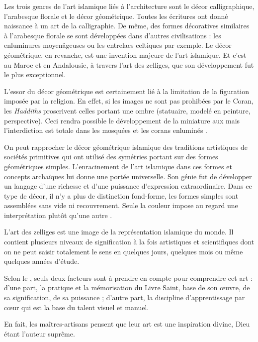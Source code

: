Les trois genres de l'art islamique liés à l'architecture sont le 
décor calligraphique, l'arabesque florale et le décor géométrique. 
Toutes les écritures ont donné naissance à un art de la calligraphie. 
De même, des formes décoratives similaires à l'arabesque florale se 
sont développées dans d'autres civilisations : les enluminures 
moyenâgeuses ou les entrelacs celtiques par exemple. Le décor 
géométrique, en revanche, est une invention majeure de l'art 
islamique. Et c'est au Maroc et en Andalousie, à travers l'art des 
zelliges, que son développement fut le plus exceptionnel.

L'essor du décor géométrique est certainement lié à la limitation de 
la figuration imposée par la religion. En effet, si les images ne sont 
pas prohibées par le Coran, les \emph{Haddiths}  proscrivent celles portant une 
ombre (statuaire, modelé en peinture, perspective). Ceci rendra 
possible le développement de la miniature aux  
mais l'interdiction est totale dans les mosquées et les corans 
enluminés \autocite{Castera_1996}.

On peut rapprocher le décor géométrique islamique des traditions 
artistiques de sociétés primitives qui ont utilisé des symétries 
portant sur des formes géométriques simples. L'enracinement de l'art 
islamique dans ces formes et concepts archaïques lui donne une portée 
universelle. Son génie fut de développer un langage d'une richesse et 
d'une puissance d'expression extraordinaire. Dans ce type de décor, 
il n'y a plus de distinction fond-forme, les formes simples sont 
assemblées sans vide ni recouvrement. Seule la couleur impose au 
regard une interprétation plutôt qu'une autre \autocite{Castera_1996}.

L'art des zelliges est une image de la représentation islamique 
du monde. Il contient plusieurs niveaux de signification à la fois 
artistiques et scientifiques dont on ne peut saisir totalement le 
sens en quelques jours, quelques mois ou même quelques années d'étude.

Selon le \maallem {}, seuls deux facteurs sont à 
prendre en compte pour comprendre cet art : d'une part, la pratique et la 
mémorisation du Livre Saint, base de son {\oe}uvre, de sa signification, 
de sa puissance ; d'autre part, la discipline d'apprentissage par c{\oe}ur 
qui est la base du talent visuel et manuel.

En fait, les maîtres-artisans pensent que leur art est une inspiration 
divine, Dieu étant l'auteur suprême.


